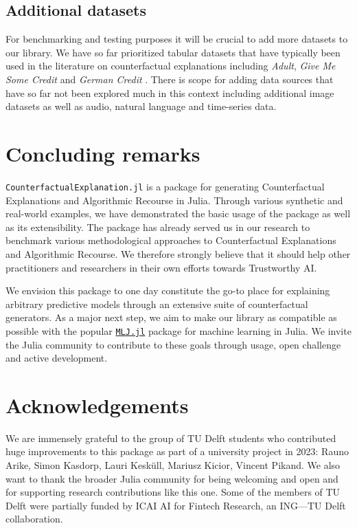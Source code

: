 \documentclass{juliacon}
\begin{document}
\hypertarget{additional-datasets}{%
\subsection{Additional datasets}\label{additional-datasets}}

For benchmarking and testing purposes it will be crucial to add more
datasets to our library. We have so far prioritized tabular datasets
that have typically been used in the literature on counterfactual
explanations including \emph{Adult}, \emph{Give Me Some Credit} and
\emph{German Credit} \autocite{karimi2020survey}. There is scope for
adding data sources that have so far not been explored much in this
context including additional image datasets as well as audio, natural
language and time-series data.

\hypertarget{sec-conclude}{%
\section{Concluding remarks}\label{sec-conclude}}

\texttt{CounterfactualExplanation.jl} is a package for generating
Counterfactual Explanations and Algorithmic Recourse in Julia. Through
various synthetic and real-world examples, we have demonstrated the
basic usage of the package as well as its extensibility. The package has
already served us in our research to benchmark various methodological
approaches to Counterfactual Explanations and Algorithmic Recourse. We
therefore strongly believe that it should help other practitioners and
researchers in their own efforts towards Trustworthy AI.

We envision this package to one day constitute the go-to place for
explaining arbitrary predictive models through an extensive suite of
counterfactual generators. As a major next step, we aim to make our
library as compatible as possible with the popular
\href{https://alan-turing-institute.github.io/MLJ.jl/dev/}{\texttt{MLJ.jl}}
package for machine learning in Julia. We invite the Julia community to
contribute to these goals through usage, open challenge and active
development.

\hypertarget{sec-ack}{%
\section{Acknowledgements}\label{sec-ack}}

We are immensely grateful to the group of TU Delft students who
contributed huge improvements to this package as part of a university
project in 2023: Rauno Arike, Simon Kasdorp, Lauri Kesküll, Mariusz
Kicior, Vincent Pikand. We also want to thank the broader Julia
community for being welcoming and open and for supporting research
contributions like this one. Some of the members of TU Delft were
partially funded by ICAI AI for Fintech Research, an ING---TU Delft
collaboration.


\printbibliography[title=References]
\end{document}
